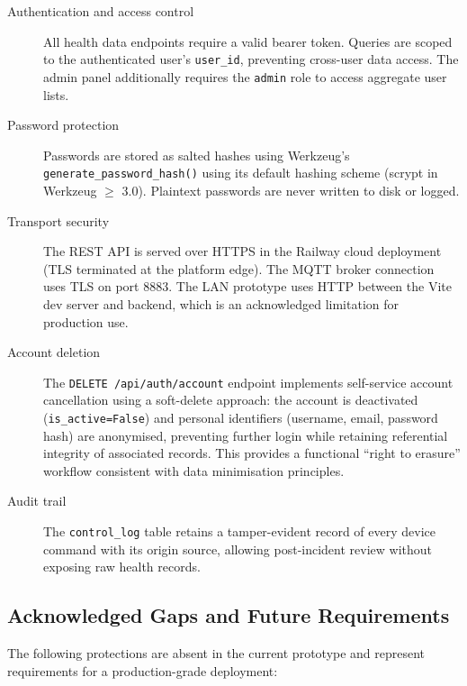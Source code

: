 \begin{description}
    \item[Authentication and access control] All health data endpoints require a
          valid bearer token. Queries are scoped to the authenticated user's
          \texttt{user\_id}, preventing cross-user data access. The admin panel
          additionally requires the \texttt{admin} role to access aggregate user lists.

    \item[Password protection] Passwords are stored as salted hashes using
          Werkzeug's \texttt{generate\_password\_hash()} using its default hashing scheme (scrypt in Werkzeug $\geq$ 3.0).
          Plaintext passwords are never written to disk or logged.

    \item[Transport security] The REST API is served over HTTPS in the Railway
          cloud deployment (TLS terminated at the platform edge). The MQTT broker
          connection uses TLS on port 8883. The LAN prototype uses HTTP
          between the Vite dev server and backend, which is an acknowledged
          limitation for production use.

    \item[Account deletion] The \texttt{DELETE /api/auth/account} endpoint implements
          self-service account cancellation using a soft-delete approach: the
          account is deactivated (\texttt{is\_active=False}) and personal
          identifiers (username, email, password hash) are anonymised, preventing
          further login while retaining referential integrity of associated
          records. This provides a functional ``right to erasure'' workflow
          consistent with data minimisation principles.

    \item[Audit trail] The \texttt{control\_log} table retains a tamper-evident
          record of every device command with its origin source, allowing
          post-incident review without exposing raw health records.
\end{description}

\subsection{Acknowledged Gaps and Future Requirements}

The following protections are absent in the current prototype and represent
requirements for a production-grade deployment:

